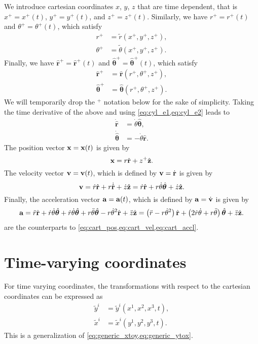 \documentclass[11pt]{article}
\newcommand{\xtilde}{\tilde{x}}
\newcommand{\ytilde}{\tilde{y}}
\newcommand{\rtilde}{\tilde{r}}
\newcommand{\thetatilde}{\tilde{\theta}}
\newcommand{\boldrhat}{\hat{\mathbf{r}}}
\newcommand{\boldthetahat}{\hat{\boldsymbol{\theta}}}
\begin{document}
We introduce cartesian coordinates $x$, $y$, $z$ that are time dependent, that is $x^+ = x^+(t)$, $y^+ = y^+(t)$, and $z^+ = z^+(t)$. Similarly, we have $r^+ = r^+(t)$ and $\theta^+=\theta^+(t)$, which satisfy
\begin{align}
    r^+ &= \rtilde(x^+, y^+, z^+), \\
    \theta^+ &= \thetatilde(x^+, y^+, z^+).
\end{align}
Finally, we have $\boldrhat^+ = \boldrhat^+(t)$ and $\boldthetahat^+=\boldthetahat^+(t)$, which satisfy
\begin{align}
    \boldrhat^+ &= \boldrhat(r^+, \theta^+, z^+), \label{eq:cyl_e1_time} \\
    \boldthetahat^+ &= \boldthetahat(r^+, \theta^+, z^+) \label{eq:cyl_e2_time}.
\end{align}
We will temporarily drop the $^+$ notation below for the sake of simplicity. Taking the time derivative of the above and using \cref{eq:cyl_e1,eq:cyl_e2} leads to
\begin{align}
    \dot{\boldrhat} &= \dot{\theta} \boldthetahat, \\
    \dot{\boldthetahat} &= -\dot{\theta} \boldrhat.
\end{align}
The position vector $\mathbf{x} = \mathbf{x}(t)$ is given by
\begin{equation}
    \label{eq:cyl_pos}
    \xvec = r \boldrhat + z^+ \hat{\zvec}.
\end{equation}
The velocity vector $\mathbf{v} = \mathbf{v}(t)$, which is defined by $\mathbf{v} = \dot{\mathbf{r}}$ is given by
\begin{equation}
    \label{eq:cyl_vel}
    \vvec = \dot{r} \boldrhat + r \dot{\boldrhat} + \dot{z} \hat{\zvec} = \dot{r} \boldrhat + r \dot{\theta} \boldthetahat + \dot{z} \hat{\zvec}.
\end{equation}
Finally, the acceleration vector $\mathbf{a} = \mathbf{a}(t)$, which is defined by $\mathbf{a} = \dot{\mathbf{v}}$ is given by
\begin{equation}
    \label{eq:cyl_accl}
    \avec = \ddot{r} \boldrhat + \dot{r} \dot{\theta} \boldthetahat + \dot{r} \dot{\theta} \boldthetahat + r \ddot{\theta} \boldthetahat - r \dot{\theta}^2 \boldrhat + \ddot{z} \hat{\zvec} = \left( \ddot{r} - r \dot{\theta}^2 \right) \boldrhat + \left( 2 \dot{r} \dot{\theta} + r \ddot{\theta} \right) \boldthetahat + \ddot{z} \hat{\zvec}.
\end{equation}
 are the counterparts to \cref{eq:cart_pos,eq:cart_vel,eq:cart_accl}.
\section{Time-varying coordinates}
For time varying coordinates, the transformations with respect to the cartesian coordinates can be expressed as
\begin{align}
    \ytilde^i &= \ytilde^i(x^1, x^2, x^3, t), \label{eq:generic_xtoy_time} \\
    \xtilde^i &= \xtilde^i(y^1,y^2,y^3, t). \label{eq:generic_ytox_time}
\end{align}
This is a generalization of \cref{eq:generic_xtoy,eq:generic_ytox}.
\end{document}
